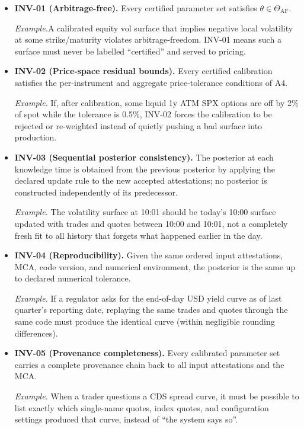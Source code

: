 \documentclass[11pt,a4paper]{article}
\begin{document}
\begin{itemize}
    \item \textbf{INV-01 (Arbitrage-free).} Every certified parameter set satisfies $\theta \in \Theta_{\text{AF}}$.

    \textit{Example.}\quad A calibrated equity vol surface that implies negative local volatility at some strike/maturity violates arbitrage-freedom. INV-01 means such a surface must never be labelled ``certified'' and served to pricing.

    \item \textbf{INV-02 (Price-space residual bounds).} Every certified calibration satisfies the per-instrument and aggregate price-tolerance conditions of A4.

    \textit{Example.} If, after calibration, some liquid 1y ATM SPX options are off by 2\% of spot while the tolerance is 0.5\%, INV-02 forces the calibration to be rejected or re-weighted instead of quietly pushing a bad surface into production.

    \item \textbf{INV-03 (Sequential posterior consistency).} The posterior at each knowledge time is obtained from the previous posterior by applying the declared update rule to the new accepted attestations; no posterior is constructed independently of its predecessor.

    \textit{Example.} The volatility surface at 10:01 should be today's 10:00 surface updated with trades and quotes between 10:00 and 10:01, not a completely fresh fit to all history that forgets what happened earlier in the day.

    \item \textbf{INV-04 (Reproducibility).} Given the same ordered input attestations, MCA, code version, and numerical environment, the posterior is the same up to declared numerical tolerance.

    \textit{Example.} If a regulator asks for the end-of-day USD yield curve as of last quarter's reporting date, replaying the same trades and quotes through the same code must produce the identical curve (within negligible rounding differences).

    \item \textbf{INV-05 (Provenance completeness).} Every calibrated parameter set carries a complete provenance chain back to all input attestations and the MCA.

    \textit{Example.} When a trader questions a CDS spread curve, it must be possible to list exactly which single-name quotes, index quotes, and configuration settings produced that curve, instead of ``the system says so''.


\end{itemize}
\end{document}
